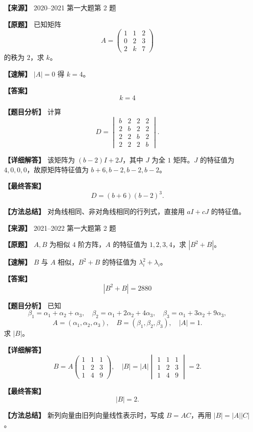 \documentclass[11pt,a4paper,UTF8]{ctexart}
\begin{document}
\begin{answerbox}
\textbf{【来源】} 2020--2021 第一大题第 2 题

\textbf{【原题】}
已知矩阵
\[
A=\begin{pmatrix}1&1&2\\0&2&3\\2&k&7\end{pmatrix}
\]
的秩为 $2$，求 $k$。

\textbf{【速解】}
$|A|=0$ 得 $k=4$。

\textbf{【答案】}
\[k=4\]
\end{answerbox}

\begin{answerbox}
\textbf{【题目分析】} 计算
\[
D=\begin{vmatrix}
b&2&2&2\\
2&b&2&2\\
2&2&b&2\\
2&2&2&b
\end{vmatrix}.
\]

\textbf{【详细解答】} 该矩阵为 $(b-2)I+2J$，其中 $J$ 为全 $1$ 矩阵。$J$ 的特征值为 $4,0,0,0$，故原矩阵特征值为 $b+6,b-2,b-2,b-2$。

\textbf{【最终答案】}
\[
D=(b+6)(b-2)^3.
\]

\textbf{【方法总结】} 对角线相同、非对角线相同的行列式，直接用 $aI+cJ$ 的特征值。
\end{answerbox}

\begin{answerbox}
\textbf{【来源】} 2021--2022 第一大题第 2 题

\textbf{【原题】}
$A,B$ 为相似 $4$ 阶方阵，$A$ 的特征值为 $1,2,3,4$，求 $|B^2+B|$。

\textbf{【速解】}
$B$ 与 $A$ 相似，$B^2+B$ 的特征值为 $\lambda_i^2+\lambda_i$。

\textbf{【答案】}
\[|B^2+B|=2880\]
\end{answerbox}

\begin{answerbox}
\textbf{【题目分析】} 已知
\[
\beta_1=\alpha_1+\alpha_2+\alpha_3,\quad
\beta_2=\alpha_1+2\alpha_2+4\alpha_3,\quad
\beta_3=\alpha_1+3\alpha_2+9\alpha_3,
\]
\[
A=(\alpha_1,\alpha_2,\alpha_3),\quad B=(\beta_1,\beta_2,\beta_3),\quad |A|=1.
\]
求 $|B|$。

\textbf{【详细解答】}
\[
B=A\begin{pmatrix}1&1&1\\1&2&3\\1&4&9\end{pmatrix},
\quad |B|=|A|\begin{vmatrix}1&1&1\\1&2&3\\1&4&9\end{vmatrix}=2.
\]

\textbf{【最终答案】}
\[
|B|=2.
\]

\textbf{【方法总结】} 新列向量由旧列向量线性表示时，写成 $B=AC$，再用 $|B|=|A||C|$。
\end{answerbox}
\end{document}
